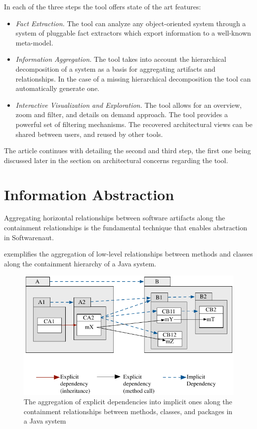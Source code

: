 \documentclass[preprint,12pt]{elsarticle}
\begin{document}
In each of the three steps the tool offers state of the art features:

\begin{itemize}
\item {\em Fact Extraction.} The tool can analyze any object-oriented system through a system of pluggable fact extractors which export information to a well-known meta-model. 
\item {\em Information Aggregation.} The tool takes into account the hierarchical decomposition of a system as a basis for aggregating artifacts and relationships. In the case of a missing hierarchical decomposition the tool can automatically generate one.
\item {\em Interactive Visualization and Exploration.} The tool allows for an overview, zoom and filter, and details on demand approach. The tool provides a powerful set of filtering mechanisms. The recovered architectural views can be shared between users, and reused by other tools.
\end{itemize}

The article continues with detailing the second and third step, the first one being discussed later in the section on architectural concerns regarding the tool.

\section {Information Abstraction} \label{sec:org}

Aggregating horizontal relationships between software artifacts along the containment relationships is the fundamental technique that enables abstraction in Softwarenaut. 

 exemplifies the aggregation of low-level relationships between methods and classes along the containment hierarchy of a Java system.

\begin{figure}[ht]
\begin{center}
\includegraphics[width=0.7\linewidth]{DependencyAggregation}
\caption{The aggregation of explicit dependencies into implicit ones along the containment relationships between methods, classes, and packages in a Java system}
\end{center}
\end{figure}
 
\end{document}

